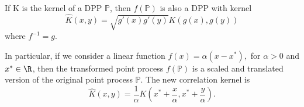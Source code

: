 \begin{proposicao} \cite{ManuelaGirottiPhD}
	If K is the kernel of a DPP $\mathbb{P}$, then $f(\mathbb{P})$ is also a DPP with kernel
	\begin{equation}
		\hat{K}(x, y) = \sqrt{g'(x) g'(y)} K(g(x), g(y))
	\end{equation}
	where $f^{-1} = g$.
	\label{Proposition: Scaling Kernel}
\end{proposicao}

In particular, if we consider a linear function $f(x) = \alpha (x - x^*),$ for $\alpha > 0$ and $x^* \in \R$, then the transformed point process $f(\mathbb{P})$ is a scaled and translated version of the original point process $\mathbb{P}$. The new correlation kernel is
\begin{equation}
	\hat{K}(x, y) = \frac{1}{\alpha} K\left(x^* + \frac{x}{\alpha}, x^* + \frac{y}{\alpha}\right).
\end{equation}

